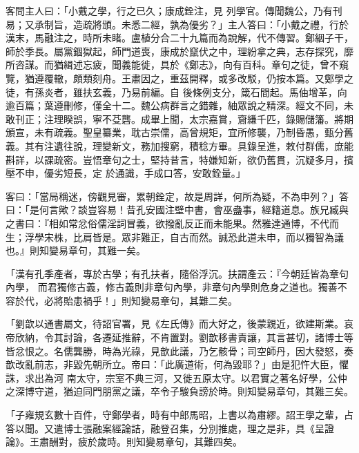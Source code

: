 \begin{pinyinscope}
 客問主人曰：「小戴之學，行之已久；康成銓注，見
 列學官。傳聞魏公，乃有刊易；又承制旨，造疏將頒。未悉二經，孰為優劣？」主人答曰：「小戴之禮，行於漢末，馬融注之，時所未睹。盧植分合二十九篇而為說解，代不傳習。鄭絪子干，師於季長。屬黨錮獄起，師門道喪，康成於竄伏之中，理紛拿之典，志存探究，靡所咨謀。而猶緝述忘疲，聞義能徙，具於《鄭志》，向有百科。章句之徒，曾不窺覽，猶遵覆轍，頗類刻舟。王肅因之，重茲開釋，或多改駁，仍按本篇。又鄭學之徒，有孫炎者，雖扶玄義，乃易前編。自
 後條例支分，箴石間起。馬伷增革，向逾百篇；葉遵刪修，僅全十二。魏公病群言之錯雜，紬眾說之精深。經文不同，未敢刊正；注理睽誤，寧不芟礱。成畢上聞，太宗嘉賞，齎縑千匹，錄賜儲籓。將期頒宣，未有疏義。聖皇纂業，耽古崇儒，高曾規矩，宜所修襲，乃制昏愚，甄分舊義。其有注遺往說，理變新文，務加搜窮，積稔方畢。具錄呈進，敕付群儒，庶能斟詳，以課疏密。豈悟章句之士，堅持昔言，特嫌知新，欲仍舊貫，沉疑多月，擯壓不申，優劣短長，定
 於通識，手成口答，安敢銓量。」



 客曰：「當局稱迷，傍觀見審，累朝銓定，故是周詳，何所為疑，不為申列？」答曰：「是何言歟？談豈容易！昔孔安國注壁中書，會巫蠱事，經籍道息。族兄臧與之書曰：『相如常忿俗儒淫詞冒義，欲撥亂反正而未能果。然雅達通博，不代而生；浮學宋株，比肩皆是。眾非難正，自古而然。誠恐此道未申，而以獨智為議也。』則知變易章句，其難一矣。



 「漢有孔季產者，專於古學；有孔扶者，隨俗浮沉。扶謂產云：『今朝廷皆為章句內學，
 而君獨修古義，修古義則非章句內學，非章句內學則危身之道也。獨善不容於代，必將貽患禍乎！」則知變易章句，其難二矣。



 「劉歆以通書屬文，待詔官署，見《左氏傳》而大好之，後蒙親近，欲建斯業。哀帝欣納，令其討論，各遷延推辭，不肯置對。劉歆移書責讓，其言甚切，諸博士等皆忿恨之。名儒龔勝，時為光祿，見歆此議，乃乞骸骨；司空師丹，因大發怒，奏歆改亂前志，非毀先朝所立。帝曰：「此廣道術，何為毀耶？」由是犯忤大臣，懼誅，求出為河
 南太守，宗室不典三河，又徙五原太守。以君實之著名好學，公仲之深博守道，猶迫同門朋黨之議，卒令子駿負謗於時。則知變易章句，其難三矣。



 「子雍規玄數十百件，守鄭學者，時有中郎馬昭，上書以為肅繆。詔王學之輩，占答以聞。又遣博士張融案經論詰，融登召集，分別推處，理之是非，具《呈證論》。王肅酬對，疲於歲時。則知變易章句，其難四矣。




\end{pinyinscope}
